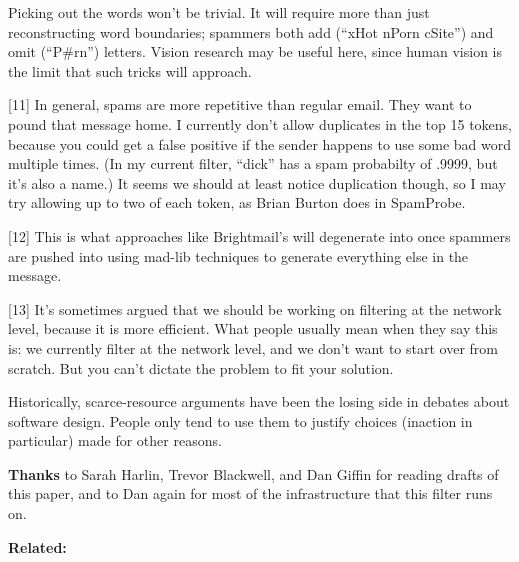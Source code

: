 Picking
                  out the words won't be trivial. It will require more than just
                  reconstructing word boundaries; spammers both add (``xHot
                  nPorn cSite'') and omit (``P\#rn'') letters. Vision research
                  may be useful here, since human vision is the limit that such
                  tricks will approach.

[11] In general, spams are
                  more repetitive than regular email. They want to pound that
                  message home. I currently don't allow duplicates in the top 15
                  tokens, because you could get a false positive if the sender
                  happens to use some bad word multiple times. (In my current
                  filter, ``dick'' has a spam probabilty of .9999, but it's also
                  a name.) It seems we should at least notice duplication
                  though, so I may try allowing up to two of each token, as
                  Brian Burton does in SpamProbe.

[12] This is what
                  approaches like Brightmail's will degenerate into once
                  spammers are pushed into using mad-lib techniques to generate
                  everything else in the message.

[13] It's sometimes
                  argued that we should be working on filtering at the network
                  level, because it is more efficient. What people usually mean
                  when they say this is: we currently filter at the network
                  level, and we don't want to start over from scratch. But you
                  can't dictate the problem to fit your solution.

Historically,
                  scarce-resource arguments have been the losing side in debates
                  about software design. People only tend to use them to justify
                  choices (inaction in particular) made for other reasons.

\textbf{Thanks}
                  to Sarah Harlin, Trevor Blackwell, and Dan Giffin for reading
                  drafts of this paper, and to Dan again for most of the
                  infrastructure that this filter runs on.



\textbf{Related:}


              
            
          
